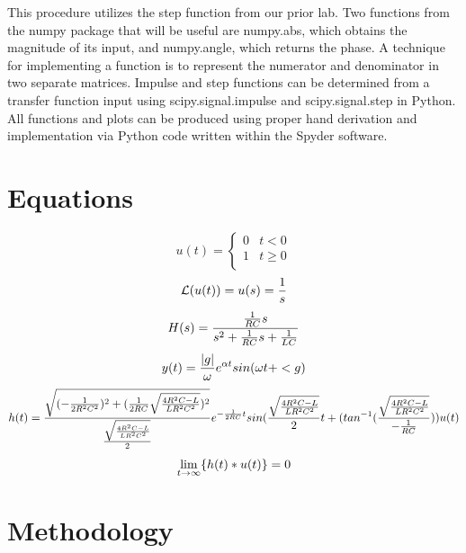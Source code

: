 \documentclass[12pt]{report}
\begin{document}
This procedure utilizes the step function from our prior lab. Two functions from the numpy package that will be useful are numpy.abs, which obtains the magnitude of its input, and numpy.angle, which returns the phase. A technique for implementing a function is to represent the numerator and denominator in two separate matrices. Impulse and step functions can be determined from a transfer function input using scipy.signal.impulse and scipy.signal.step in Python.  All functions and plots can be produced using proper hand derivation and implementation via Python code written within the Spyder software. \\
	
\section{Equations}

\begin{equation*}
	u(t)=
	\begin{cases}
		0 & t < 0 \\
		1 & t \ge 0 \\
	\end{cases}
\end{equation*}
\begin{equation*}
	\mathcal{L}(u(t)) = u(s) = \frac{1}{s} \\
\end{equation*}
\begin{equation}
	H(s) = \frac{\frac{1}{RC}s}{s^2 + \frac{1}{RC}s + \frac{1}{LC}} \\
\end{equation}
\begin{equation*}
	y(t) = \frac{|g|}{\omega}e^{\alpha t}sin(\omega t + <g) \\
\end{equation*}
\begin{equation}
	h(t) = \frac{\sqrt{(-\frac{1}{2R^2C^2})^2 + (\frac{1}{2RC}\sqrt{\frac{4R^2C-L}{LR^2C^2}})^2}}{\frac{\sqrt{\frac{4R^2C-L}{LR^2C^2}}}{2}}e^{-\frac{1}{2RC}t}sin(\frac{\sqrt{\frac{4R^2C-L}{LR^2C^2}}}{2}t + (tan^{-1}(\frac{\sqrt{\frac{4R^2C-L}{LR^2C^2}}}{-\frac{1}{RC}}))u(t) \\ 
\end{equation}
\begin{equation*}
	\lim_{t\rightarrow \infty}\{h(t) * u(t)\} = 0 \\
\end{equation*}
	
\section{Methodology}
\end{document}
